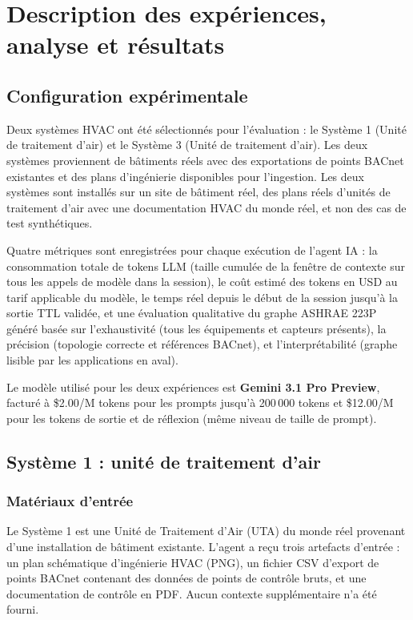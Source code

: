 \section{Description des expériences, analyse et résultats}
\label{sec:results}

\subsection{Configuration expérimentale}

Deux systèmes HVAC ont été sélectionnés pour l'évaluation : le Système 1 (Unité de traitement d'air) et
le Système 3 (Unité de traitement d'air). Les deux systèmes proviennent de bâtiments réels avec des
exportations de points BACnet existantes et des plans d'ingénierie disponibles pour l'ingestion. Les deux
systèmes sont installés sur un site de bâtiment réel, des plans réels d'unités de traitement d'air avec
une documentation HVAC du monde réel, et non des cas de test synthétiques.

Quatre métriques sont enregistrées pour chaque exécution de l'agent IA : la consommation totale de tokens
LLM (taille cumulée de la fenêtre de contexte sur tous les appels de modèle dans la session), le coût
estimé des tokens en USD au tarif applicable du modèle, le temps réel depuis le début de la session
jusqu'à la sortie TTL validée, et une évaluation qualitative du graphe ASHRAE 223P généré basée sur
l'exhaustivité (tous les équipements et capteurs présents), la précision (topologie correcte et références
BACnet), et l'interprétabilité (graphe lisible par les applications en aval).

Le modèle utilisé pour les deux expériences est \textbf{Gemini 3.1 Pro Preview}, facturé à
\$2.00/M tokens pour les prompts jusqu'à 200\,000 tokens et \$12.00/M pour les tokens de sortie et de
réflexion (même niveau de taille de prompt).

\subsection{Système 1 : unité de traitement d'air}

\subsubsection{Matériaux d'entrée}

Le Système 1 est une Unité de Traitement d'Air (UTA) du monde réel provenant d'une installation de
bâtiment existante.
L'agent a reçu trois artefacts d'entrée : un plan schématique d'ingénierie HVAC (PNG),
un fichier CSV d'export de points BACnet contenant des données de points de contrôle bruts, et une
documentation de contrôle en PDF. Aucun contexte supplémentaire n'a été fourni.

